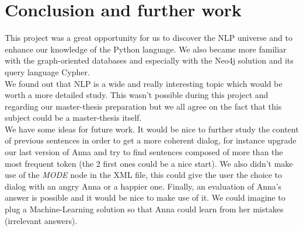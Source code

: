 \section{Conclusion and further work}
This project was a great opportunity for us to discover the NLP universe and to enhance our knowledge of the Python language. We also became more familiar with the graph-oriented databases and especially with the Neo4j solution and its query language Cypher.\\

We found out that NLP is a wide and really interesting topic which would be worth a more detailed study. This wasn't possible during this project and regarding our master-thesis preparation but we all agree on the fact that this subject could be a master-thesis itself.\\

We have some ideas for future work. It would be nice to further study the content of previous sentences in order to get a more coherent dialog, for instance upgrade our last version of Anna and try to find sentences composed of more than the most frequent token (the 2 first ones could be a nice start). We also didn't make use of the \emph{MODE} node in the XML file, this could give the user the choice to dialog with an angry Anna or a happier one. Finally, an evaluation of Anna's answer is possible and it would be nice to make use of it. We could imagine to plug a Machine-Learning solution so that Anna could learn from her mistakes (irrelevant answers).
